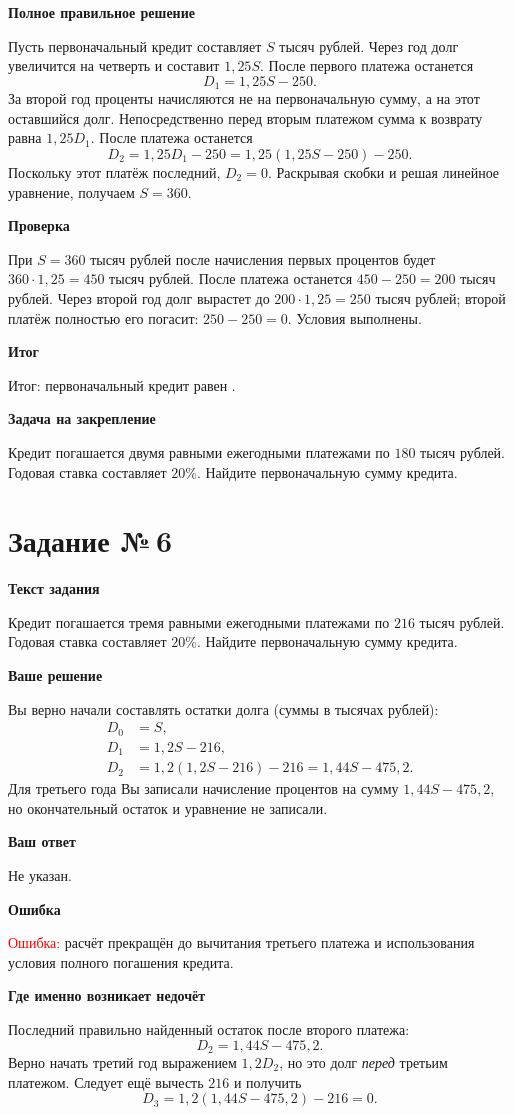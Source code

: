 \documentclass[12pt,a4paper]{article}
\newcommand{\subpart}[1]{\par\medskip\noindent\textbf{#1}\par\nobreak\smallskip}
\newcommand{\rate}{\text{ тыс. руб.}}
\begin{document}
\subpart{Полное правильное решение}
Пусть первоначальный кредит составляет $S$ тысяч рублей.
Через год долг увеличится на четверть и составит $1{,}25S$.
После первого платежа останется
\[
D_1=1{,}25S-250.
\]
За второй год проценты начисляются не на первоначальную сумму,
а на этот оставшийся долг. Непосредственно перед вторым платежом сумма
к возврату равна $1{,}25D_1$. После платежа останется
\[
D_2=1{,}25D_1-250
   =1{,}25(1{,}25S-250)-250.
\]
Поскольку этот платёж последний, $D_2=0$. Раскрывая скобки и решая
линейное уравнение, получаем $S=360$.

\subpart{Проверка}
При $S=360$ тысяч рублей после начисления первых процентов будет
$360\cdot1{,}25=450$ тысяч рублей. После платежа останется
$450-250=200$ тысяч рублей. Через второй год долг вырастет до
$200\cdot1{,}25=250$ тысяч рублей; второй платёж полностью его погасит:
$250-250=0$. Условия выполнены.

\subpart{Итог}
\textcolor{teal!60!black}{Итог:} первоначальный кредит равен
\boxed{360\rate}.

\subpart{Задача на закрепление}
Кредит погашается двумя равными ежегодными платежами по $180$ тысяч рублей.
Годовая ставка составляет $20\%$. Найдите первоначальную сумму кредита.

\clearpage
{}\label{task:6}
\section*{Задание №\,6}
\subpart{Текст задания}
Кредит погашается тремя равными ежегодными платежами по $216$ тысяч рублей.
Годовая ставка составляет $20\%$. Найдите первоначальную сумму кредита.

\subpart{Ваше решение}
Вы верно начали составлять остатки долга (суммы в тысячах рублей):
\begin{align*}
D_0&=S,\\
D_1&=1{,}2S-216,\\
D_2&=1{,}2(1{,}2S-216)-216
     =1{,}44S-475{,}2.
\end{align*}
Для третьего года Вы записали начисление процентов на сумму
$1{,}44S-475{,}2$, но окончательный остаток и уравнение не записали.

\subpart{Ваш ответ}
Не указан.

\subpart{Ошибка}
\textcolor{red}{Ошибка:} расчёт прекращён до вычитания третьего платежа
и использования условия полного погашения кредита.

\subpart{Где именно возникает недочёт}
Последний правильно найденный остаток после второго платежа:
\[
D_2=1{,}44S-475{,}2.
\]
Верно начать третий год выражением $1{,}2D_2$, но это долг
\emph{перед} третьим платежом. Следует ещё вычесть $216$ и получить
\[
D_3=1{,}2(1{,}44S-475{,}2)-216=0.
\]
\end{document}
